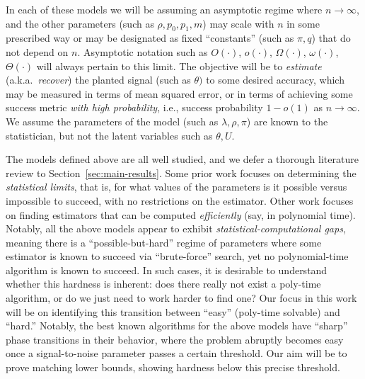 \documentclass[11pt]{article}
\begin{document}
\noindent In each of these models we will be assuming an asymptotic regime where $n \to \infty$, and the other parameters (such as $\rho, p_0, p_1, m$) may scale with $n$ in some prescribed way or may be designated as fixed ``constants'' (such as $\pi,q$) that do not depend on $n$. Asymptotic notation such as $O(\cdot)$, $o(\cdot)$, $\Omega(\cdot)$, $\omega(\cdot)$, $\Theta(\cdot)$ will always pertain to this limit. The objective will be to \emph{estimate} (a.k.a.\ \emph{recover}) the planted signal (such as $\theta)$ to some desired accuracy, which may be measured in terms of mean squared error, or in terms of achieving some success metric \emph{with high probability}, i.e., success probability $1-o(1)$ as $n \to \infty$. We assume the parameters of the model (such as $\lambda,\rho,\pi$) are known to the statistician, but not the latent variables such as $\theta, U$.

The models defined above are all well studied, and we defer a thorough literature review to Section~\ref{sec:main-results}. Some prior work focuses on determining the \emph{statistical limits}, that is, for what values of the parameters is it possible versus impossible to succeed, with no restrictions on the estimator. Other work focuses on finding estimators that can be computed \emph{efficiently} (say, in polynomial time). Notably, all the above models appear to exhibit \emph{statistical-computational gaps}, meaning there is a ``possible-but-hard'' regime of parameters where some estimator is known to succeed via ``brute-force'' search, yet no polynomial-time algorithm is known to succeed. In such cases, it is desirable to understand whether this hardness is inherent: does there really not exist a poly-time algorithm, or do we just need to work harder to find one? Our focus in this work will be on identifying this transition between ``easy'' (poly-time solvable) and ``hard.'' Notably, the best known algorithms for the above models have ``sharp'' phase transitions in their behavior, where the problem abruptly becomes easy once a signal-to-noise parameter passes a certain threshold. Our aim will be to prove matching lower bounds, showing hardness below this precise threshold.
\end{document}
